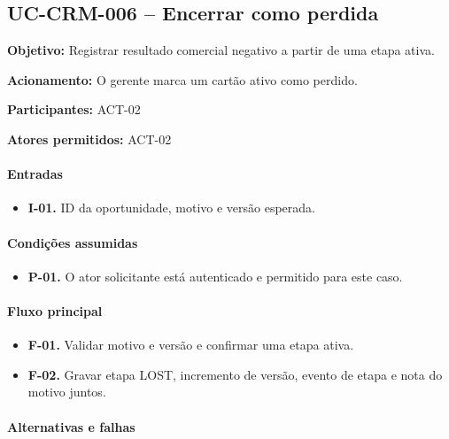 \documentclass[10pt,a4paper]{article}
\begin{document}
\subsection{UC-CRM-006 -- Encerrar como perdida}

\textbf{Objetivo:} Registrar resultado comercial negativo a partir de uma etapa ativa.

\textbf{Acionamento:} O gerente marca um cartão ativo como perdido.

\textbf{Participantes:} ACT-02

\textbf{Atores permitidos:} ACT-02

\paragraph{Entradas}

\begin{itemize}

\item \textbf{I-01.} ID da oportunidade, motivo e versão esperada.

\end{itemize}

\paragraph{Condições assumidas}

\begin{itemize}

\item \textbf{P-01.} O ator solicitante está autenticado e permitido para este caso.

\end{itemize}

\paragraph{Fluxo principal}

\begin{itemize}

\item \textbf{F-01.} Validar motivo e versão e confirmar uma etapa ativa.

\item \textbf{F-02.} Gravar etapa LOST, incremento de versão, evento de etapa e nota do motivo juntos.

\end{itemize}

\paragraph{Alternativas e falhas}
\end{document}
